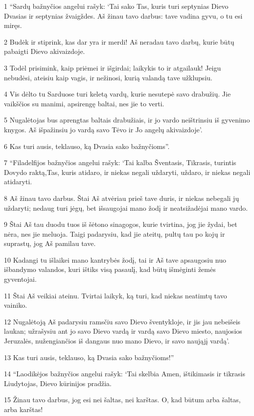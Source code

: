 \par 1 “Sardų bažnyčios angelui rašyk: ‘Tai sako Tas, kuris turi septynias Dievo Dvasias ir septynias žvaigždes. Aš žinau tavo darbus: tave vadina gyvu, o tu esi miręs. 
\par 2 Budėk ir stiprink, kas dar yra ir merdi! Aš neradau tavo darbų, kurie būtų pabaigti Dievo akivaizdoje. 
\par 3 Todėl prisimink, kaip priėmei ir išgirdai; laikykis to ir atgailauk! Jeigu nebudėsi, ateisiu kaip vagis, ir nežinosi, kurią valandą tave užklupsiu. 
\par 4 Vis dėlto tu Sarduose turi keletą vardų, kurie nesutepė savo drabužių. Jie vaikščios su manimi, apsirengę baltai, nes jie to verti. 
\par 5 Nugalėtojas bus aprengtas baltais drabužiais, ir jo vardo neištrinsiu iš gyvenimo knygos. Aš išpažinsiu jo vardą savo Tėvo ir Jo angelų akivaizdoje’. 
\par 6 Kas turi ausis, teklauso, ką Dvasia sako bažnyčioms”. 
\par 7 “Filadelfijos bažnyčios angelui rašyk: ‘Tai kalba Šventasis, Tikrasis, turintis Dovydo raktą,­Tas, kuris atidaro, ir niekas negali uždaryti, uždaro, ir niekas negali atidaryti. 
\par 8 Aš žinau tavo darbus. Štai Aš atvėriau prieš tave duris, ir niekas nebegali jų uždaryti; nedaug turi jėgų, bet išsaugojai mano žodį ir neatsižadėjai mano vardo. 
\par 9 Štai Aš tau duodu tuos iš šėtono sinagogos, kurie tvirtina, jog jie žydai, bet nėra, nes jie meluoja. Taigi padarysiu, kad jie ateitų, pultų tau po kojų ir suprastų, jog Aš pamilau tave. 
\par 10 Kadangi tu išlaikei mano kantrybės žodį, tai ir Aš tave apsaugosiu nuo išbandymo valandos, kuri ištiks visą pasaulį, kad būtų išmėginti žemės gyventojai. 
\par 11 Štai Aš veikiai ateinu. Tvirtai laikyk, ką turi, kad niekas neatimtų tavo vainiko. 
\par 12 Nugalėtoją Aš padarysiu ramsčiu savo Dievo šventykloje, ir jis jau nebeišeis laukan; užrašysiu ant jo savo Dievo vardą ir vardą savo Dievo miesto, naujosios Jeruzalės, nužengiančios iš dangaus nuo mano Dievo, ir savo naująjį vardą’. 
\par 13 Kas turi ausis, teklauso, ką Dvasia sako bažnyčioms!” 
\par 14 “Laodikėjos bažnyčios angelui rašyk: ‘Tai skelbia Amen, ištikimasis ir tikrasis Liudytojas, Dievo kūrinijos pradžia. 
\par 15 Žinau tavo darbus, jog esi nei šaltas, nei karštas. O, kad būtum arba šaltas, arba karštas! 
